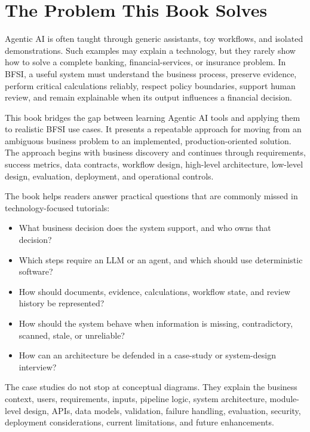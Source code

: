 \section*{The Problem This Book Solves}

Agentic AI is often taught through generic assistants, toy workflows, and isolated demonstrations. Such examples may explain a technology, but they rarely show how to solve a complete banking, financial-services, or insurance problem. In BFSI, a useful system must understand the business process, preserve evidence, perform critical calculations reliably, respect policy boundaries, support human review, and remain explainable when its output influences a financial decision.

This book bridges the gap between learning Agentic AI tools and applying them to realistic BFSI use cases. It presents a repeatable approach for moving from an ambiguous business problem to an implemented, production-oriented solution. The approach begins with business discovery and continues through requirements, success metrics, data contracts, workflow design, high-level architecture, low-level design, evaluation, deployment, and operational controls.

The book helps readers answer practical questions that are commonly missed in technology-focused tutorials:

\begin{itemize}
  \item What business decision does the system support, and who owns that decision?
  \item Which steps require an LLM or an agent, and which should use deterministic software?
  \item How should documents, evidence, calculations, workflow state, and review history be represented?
  \item How should the system behave when information is missing, contradictory, scanned, stale, or unreliable?
  \item How can an architecture be defended in a case-study or system-design interview?
\end{itemize}

The case studies do not stop at conceptual diagrams. They explain the business context, users, requirements, inputs, pipeline logic, system architecture, module-level design, APIs, data models, validation, failure handling, evaluation, security, deployment considerations, current limitations, and future enhancements.

